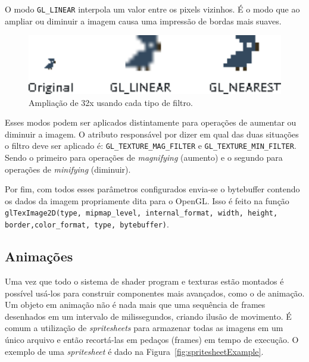 \documentclass[12pt, 
openright, 
oneside, 
a4paper,    
brazil]{facom-ufu-abntex2}
\begin{document}
O modo \texttt{GL_LINEAR} interpola um valor entre os pixels vizinhos. É o modo que ao ampliar ou diminuir a imagem causa uma impressão de bordas mais suaves.

\begin{figure}[H]
	\centering
	\includegraphics[width=36em]{imagens/gl_filters.png}
	\caption{Ampliação de 32x usando cada tipo de filtro. \label{fig:ampli}}
\end{figure}

Esses modos podem ser aplicados distintamente para operações de aumentar ou diminuir a imagem. O atributo responsável por dizer em qual das duas situações o filtro deve ser aplicado é: \texttt{GL_TEXTURE_MAG_FILTER} e \texttt{GL_TEXTURE_MIN_FILTER}. Sendo o primeiro para operações de \textit{magnifying} (aumento) e o segundo para operações de \textit{minifying} (diminuir).

Por fim, com todos esses parâmetros configurados envia-se o bytebuffer contendo os dados da imagem propriamente dita para o OpenGL. Isso é feito na função \linebreak \texttt{glTexImage2D(type, mipmap_level, internal_format, width, height, border,\linebreak color_format, type, bytebuffer)}.

\subsection{Animações}
Uma vez que todo o sistema de shader program e texturas estão montados é possível usá-los para construir componentes mais avançados, como o de animação. Um objeto em animação não é nada mais que uma sequência de frames desenhados em um intervalo de milissegundos, criando ilusão de movimento. É comum a utilização de \textit{spritesheets} para armazenar todas as imagens em um único arquivo e então recortá-las em pedaços (frames) em tempo de execução. O exemplo de uma \textit{spritesheet} é dado na Figura~\ref{fig:spritesheetExample}.
\end{document}
